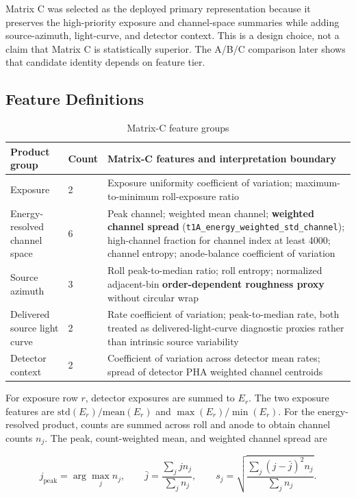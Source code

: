 \documentclass[conference]{IEEEtran}
\begin{document}
Matrix C was selected as the deployed primary representation because it preserves the high-priority exposure and channel-space summaries while adding source-azimuth, light-curve, and detector context. This is a design choice, not a claim that Matrix C is statistically superior. The A/B/C comparison later shows that candidate identity depends on feature tier.


\subsection{Feature Definitions}

\begin{table}[t]
\centering
\caption{Matrix-C feature groups}
\label{tab:2}
\footnotesize
\begin{tabular}{@{}p{}p{}p{}@{}}
\toprule
Product group & Count & Matrix-C features and interpretation boundary \\
\midrule
Exposure & 2 & Exposure uniformity coefficient of variation; maximum-to-minimum roll-exposure ratio \\
Energy-resolved channel space & 6 & Peak channel; weighted mean channel; \textbf{weighted channel spread} (\texttt{t1A\_energy\_weighted\_std\_channel}); high-channel fraction for channel index at least 4000; channel entropy; anode-balance coefficient of variation \\
Source azimuth & 3 & Roll peak-to-median ratio; roll entropy; normalized adjacent-bin \textbf{order-dependent roughness proxy} without circular wrap \\
Delivered source light curve & 2 & Rate coefficient of variation; peak-to-median rate, both treated as delivered-light-curve diagnostic proxies rather than intrinsic source variability \\
Detector context & 2 & Coefficient of variation across detector mean rates; spread of detector PHA weighted channel centroids \\
\bottomrule
\end{tabular}
\end{table}

For exposure row $r$, detector exposures are summed to $E_r$. The two exposure features are $\mathrm{std}(E_r)/\mathrm{mean}(E_r)$ and $\max(E_r)/\min(E_r)$. For the energy-resolved product, counts are summed across roll and anode to obtain channel counts $n_j$. The peak, count-weighted mean, and weighted channel spread are


\begin{equation*}
j_{\mathrm{peak}}=\arg\max_j n_j,\qquad
\bar j=\frac{\sum_j jn_j}{\sum_j n_j},\qquad
s_j=\sqrt{\frac{\sum_j(j-\bar j)^2n_j}{\sum_jn_j}}.
\end{equation*}
\end{document}
